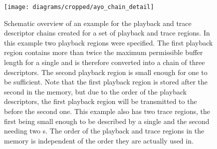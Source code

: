 \begin{figure}[htbp]
\centerline{\texttt{[image: diagrams/cropped/ayo\_chain\_detail]}}
\caption{Schematic overview of an example for the playback and trace descriptor chains created for a set of playback and trace regions. In this example two playback regions were specified. The first playback region contains more than twice the maximum permissible buffer length for a single \descriptor{} and is therefore converted into a chain of three descriptors. The second playback region is small enough for one \descriptor{} to be sufficient. Note that the first playback region is stored after the second in the memory, but due to the order of the playback descriptors, the first playback region will be transmitted to the \pbexec{} before the second one. This example also has two trace regions, the first being small enough to be described by a single \descriptor{} and the second needing two \descriptor{}s. The order of the playback and trace regions in the \DDR{} memory is independent of the order they are actually used in.}\label{fig:ayo_chain_detail}
\end{figure}

